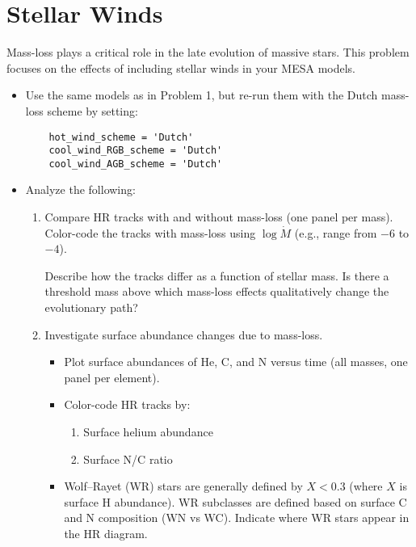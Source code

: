 \documentclass[11pt,a4paper]{article}
\begin{document}
\section{Stellar Winds}

Mass-loss plays a critical role in the late evolution of massive stars. This problem focuses on the effects of including stellar winds in your MESA models.

\begin{itemize}[leftmargin=1.5em]
    \item Use the same models as in Problem 1, but re-run them with the Dutch mass-loss scheme by setting:
    
    \begin{lstlisting}
    hot_wind_scheme = 'Dutch'
    cool_wind_RGB_scheme = 'Dutch'
    cool_wind_AGB_scheme = 'Dutch'
    \end{lstlisting}

    \item Analyze the following:
    \begin{enumerate}[label=(\alph*)]
        \item Compare HR tracks with and without mass-loss (one panel per mass). Color-code the tracks with mass-loss using $\log \dot{M}$ (e.g., range from $-6$ to $-4$).
        
        Describe how the tracks differ as a function of stellar mass. Is there a threshold mass above which mass-loss effects qualitatively change the evolutionary path?

        \item Investigate surface abundance changes due to mass-loss. 
        \begin{itemize}
            \item Plot surface abundances of He, C, and N versus time (all masses, one panel per element).
            \item Color-code HR tracks by:
            \begin{enumerate}
                \item Surface helium abundance
                \item Surface N/C ratio
            \end{enumerate}
            \item Wolf–Rayet (WR) stars are generally defined by $X < 0.3$ (where $X$ is surface H abundance). WR subclasses are defined based on surface C and N composition (WN vs WC). Indicate where WR stars appear in the HR diagram.
        \end{itemize}
    \end{enumerate}
\end{itemize}
\end{document}

